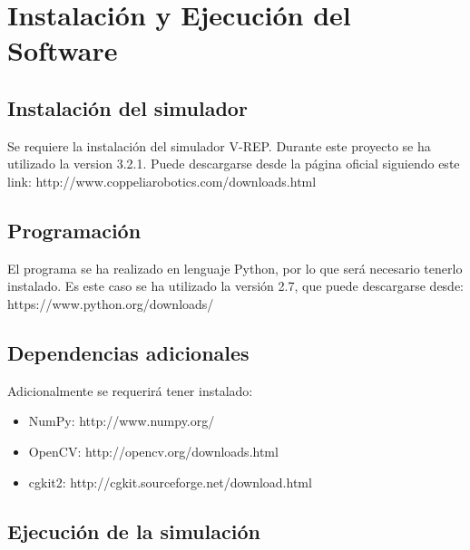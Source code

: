 \chapter{Instalación y Ejecución del Software}
\label{app:installing}

\section{Instalación del simulador}

Se requiere la instalación del simulador V-REP. Durante este proyecto se ha utilizado la version 3.2.1. Puede descargarse desde la página oficial siguiendo este link: http://www.coppeliarobotics.com/downloads.html

\section{Programación}

El programa se ha realizado en lenguaje Python, por lo que será necesario tenerlo instalado. Es este caso se ha utilizado la versión 2.7, que puede descargarse desde: https://www.python.org/downloads/

\section{Dependencias adicionales}

Adicionalmente se requerirá tener instalado:
\begin{itemize}
	\item NumPy: http://www.numpy.org/
	\item OpenCV: http://opencv.org/downloads.html 
	\item cgkit2: http://cgkit.sourceforge.net/download.html
\end{itemize}

\section{Ejecución de la simulación}

